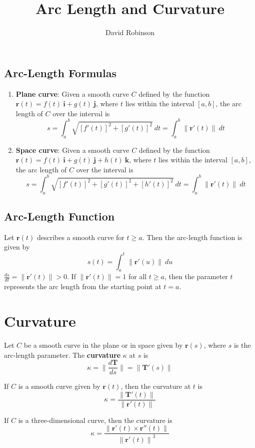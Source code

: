 \documentclass{article}
\title{Arc Length and Curvature}
\author{David Robinson}
\date{}
\begin{document}
\maketitle

\subsection*{Arc-Length Formulas}
\begin{enumerate}
    \item \textbf{Plane curve}: Given a smooth curve $C$ defined by the function $\mathbf{r}(t)=f(t)\:\mathbf{i}+g(t)\:\mathbf{j}$, where $t$ lies within the interval $[a, b]$, the arc length of $C$ over the interval is
    \[s=\int_a^b\sqrt{{[f'(t)]}^2+{[g'(t)]}^2}\: dt=\int_a^b\|\mathbf{r}'(t)\|\: dt\]
    \item \textbf{Space curve}: Given a smooth curve $C$ defined by the function $\mathbf{r}(t)=f(t)\:\mathbf{i}+g(t)\:\mathbf{j}+h(t)\:\mathbf{k}$, where $t$ lies within the interval $[a, b]$, the arc length of $C$ over the interval is
    \[s=\int_a^b\sqrt{{[f'(t)]}^2+{[g'(t)]}^2+{[h'(t)]}^2}\: dt=\int_a^b\|\mathbf{r}'(t)\|\: dt\]
\end{enumerate}

\subsection*{Arc-Length Function}
Let $\mathbf{r}(t)$ describes a smooth curve for $t\geq a$. Then the arc-length function is given by
\[s(t)=\int_a^t\|\mathbf{r}'(u)\|\: du\]
$\frac{ds}{dt}=\|\mathbf{r}'(t)\|>0$. If $\|\mathbf{r}'(t)\|=1$ for all $t\geq a$, then the parameter $t$ represents the arc length from the starting point at $t=a$.

\section*{Curvature}

Let $C$ be a smooth curve in the plane or in space given by $\mathbf{r}(s)$, where $s$ is the arc-length parameter. The \textbf{curvature} $\kappa$ at $s$ is
\[\kappa = \bigg\|\frac{d\mathbf{T}}{ds}\bigg\|=\|\mathbf{T}'(s)\|\]

If $C$ is a smooth curve given by $\mathbf{r}(t)$, then the curvature at $t$ is
\[\kappa = \frac{\|\mathbf{T}'(t)\|}{\|\mathbf{r}'(t)\|}\]

If $C$ is a three-dimensional curve, then the curvature is
\[\kappa = \frac{\|\mathbf{r}'(t)\times \mathbf{r}''(t)\|}{{\|\mathbf{r}'(t)\|}^3}\]
\end{document}
